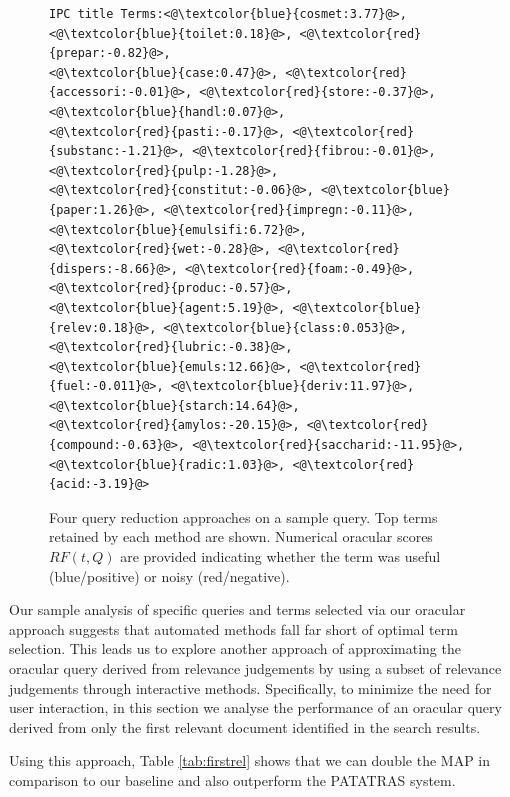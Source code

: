 \begin{figure}[t!]
\begin{framed}
\begin{lstlisting}[basicstyle=\scriptsize\ttfamily , linewidth=\columnwidth,breaklines=true]
IPC title Terms:<@\textcolor{blue}{cosmet:3.77}@>, <@\textcolor{blue}{toilet:0.18}@>, <@\textcolor{red}{prepar:-0.82}@>, 
<@\textcolor{blue}{case:0.47}@>, <@\textcolor{red}{accessori:-0.01}@>, <@\textcolor{red}{store:-0.37}@>, <@\textcolor{blue}{handl:0.07}@>, 
<@\textcolor{red}{pasti:-0.17}@>, <@\textcolor{red}{substanc:-1.21}@>, <@\textcolor{red}{fibrou:-0.01}@>, <@\textcolor{red}{pulp:-1.28}@>, 
<@\textcolor{red}{constitut:-0.06}@>, <@\textcolor{blue}{paper:1.26}@>, <@\textcolor{red}{impregn:-0.11}@>, <@\textcolor{blue}{emulsifi:6.72}@>, 
<@\textcolor{red}{wet:-0.28}@>, <@\textcolor{red}{dispers:-8.66}@>, <@\textcolor{red}{foam:-0.49}@>, <@\textcolor{red}{produc:-0.57}@>, 
<@\textcolor{blue}{agent:5.19}@>, <@\textcolor{blue}{relev:0.18}@>, <@\textcolor{blue}{class:0.053}@>, <@\textcolor{red}{lubric:-0.38}@>, 
<@\textcolor{blue}{emuls:12.66}@>, <@\textcolor{red}{fuel:-0.011}@>, <@\textcolor{blue}{deriv:11.97}@>, <@\textcolor{blue}{starch:14.64}@>, 
<@\textcolor{red}{amylos:-20.15}@>, <@\textcolor{red}{compound:-0.63}@>, <@\textcolor{red}{saccharid:-11.95}@>, 
<@\textcolor{blue}{radic:1.03}@>, <@\textcolor{red}{acid:-3.19}@> 
 \end{lstlisting} 
 \vspace*{-2ex}
\end{framed}
 \vspace*{-2ex}
  \caption{Four query reduction approaches on a sample query.  Top
    terms retained by each method are shown.  Numerical oracular
    scores $\mathit{RF}(t,Q)$ are provided indicating whether the term
    was useful (blue/positive) or noisy (red/negative).}
  \label{fig:anecdotal}  
\end{figure}

Our sample analysis of specific queries and terms selected via our oracular
approach suggests that automated methods fall far short of optimal term selection.
This leads us to explore another approach of approximating the oracular query
derived from relevance judgements by using a subset of relevance judgements
through interactive methods.  Specifically, to minimize the need for user interaction,
in this section we analyse the performance of an oracular query derived from
only the first relevant document identified in the search results.

Using this approach, Table \ref{tab:firstrel} shows that we can double the MAP in comparison to our baseline and also outperform the PATATRAS system.

